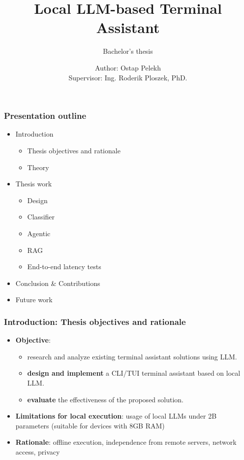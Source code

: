 \documentclass[10pt,aspectratio=169]{beamer}
\title[Bachelor’s thesis Presentation]{Local LLM-based Terminal Assistant}
\subtitle{Bachelor’s thesis}
\author[Ostap Pelekh]{Author: Ostap Pelekh\\Supervisor: Ing. Roderik Ploszek, PhD.}
\institute[Slovak University of Technology in Bratislava]{Faculty of Electrical Engineering and Information Technology (FEI)}
\date[]{}
\begin{document}

\begin{frame}
    \titlepage
\end{frame}

\begin{frame}
    \frametitle{Presentation outline}
    \begin{itemize}
        \item Introduction
            \begin{itemize}
                \item Thesis objectives and rationale
                \item Theory
            \end{itemize}
        \item Thesis work
             \begin{itemize}
                 \item Design
                 \item Classifier
                 \item Agentic
                 \item RAG
                 \item End-to-end latency tests
             \end{itemize}
        \item Conclusion \& Contributions
        \item Future work
    \end{itemize}
\end{frame}

\begin{frame}
    \frametitle{Introduction: Thesis objectives and rationale}
    \begin{itemize}
        \item \textbf{Objective}:
            \begin{itemize}
                \item research and analyze existing terminal assistant solutions
                    using LLM.
                \item \textbf{design and implement} a CLI/TUI terminal assistant
                    based on local LLM.
                \item \textbf{evaluate} the effectiveness of the proposed
                    solution.
            \end{itemize}
        \item \textbf{Limitations for local execution}: usage of local LLMs
            under 2B parameters (suitable for devices with 8GB RAM)
    \vspace{0.5cm} \small
        \item \textbf{Rationale}: offline execution, independence from remote
            servers, network access, privacy
    \end{itemize}
\end{frame}
\end{document}
